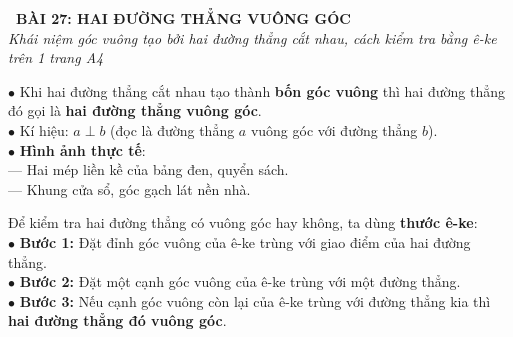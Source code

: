 \documentclass[14pt,a4paper,oneside]{extbook}
\begin{document}
\noindent
\begin{tcolorbox}[
  enhanced,
  colback=teal!8!white,
  colframe=teal!80!black,
  arc=3mm, boxrule=1pt,
  left=3mm, right=3mm, top=2mm, bottom=2mm,
  halign=center
]
  {\Large\bfseries\color{teal!90!black}\faBookmark\ BÀI 27: HAI ĐƯỜNG THẲNG VUÔNG GÓC}\\[1.5pt]
  {\footnotesize\itshape\color{black!75} Khái niệm góc vuông tạo bởi hai đường thẳng cắt nhau, cách kiểm tra bằng ê-ke trên 1 trang A4}
\end{tcolorbox}

\vspace{2mm}

\noindent
\begin{minipage}[t]{0.49\textwidth}
  \begin{tcolorbox}[
    enhanced,
    title={\footnotesize\bfseries\color{white}\faCompass\ 1. Khái niệm hai đường thẳng vuông góc},
    colback=blue!2!white,
    colframe=blue!75!black,
    arc=2.5mm, boxrule=0.8pt, top=1.8mm, bottom=1.8mm, left=2mm, right=2mm
  ]
    \footnotesize
    $\bullet$ Khi hai đường thẳng cắt nhau tạo thành \textbf{bốn góc vuông} thì hai đường thẳng đó gọi là \textbf{hai đường thẳng vuông góc}.\\
    $\bullet$ Kí hiệu: $a \perp b$ (đọc là đường thẳng $a$ vuông góc với đường thẳng $b$).\\
    $\bullet$ \textbf{Hình ảnh thực tế}:\\
    --- Hai mép liền kề của bảng đen, quyển sách.\\
    --- Khung cửa sổ, góc gạch lát nền nhà.
  \end{tcolorbox}
\end{minipage}%
\hfill
\begin{minipage}[t]{0.49\textwidth}
  \begin{tcolorbox}[
    enhanced,
    title={\footnotesize\bfseries\color{white}\faCrop\ 2. Kiểm tra bằng thước ê-ke},
    colback=teal!2!white,
    colframe=teal!75!black,
    arc=2.5mm, boxrule=0.8pt, top=1.8mm, bottom=1.8mm, left=2mm, right=2mm
  ]
    \footnotesize
    Để kiểm tra hai đường thẳng có vuông góc hay không, ta dùng \textbf{thước ê-ke}:\\
    $\bullet$ \textbf{Bước 1:} Đặt đỉnh góc vuông của ê-ke trùng với giao điểm của hai đường thẳng.\\
    $\bullet$ \textbf{Bước 2:} Đặt một cạnh góc vuông của ê-ke trùng với một đường thẳng.\\
    $\bullet$ \textbf{Bước 3:} Nếu cạnh góc vuông còn lại của ê-ke trùng với đường thẳng kia thì \textbf{hai đường thẳng đó vuông góc}.
  \end{tcolorbox}
\end{minipage}
\end{document}
